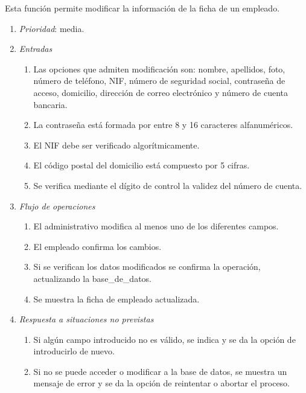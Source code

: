 
 \label{fun:editarempleado}
	Esta función permite modificar la información de la ficha de un empleado.

	\begin{enumerate}
		\item \textit{Prioridad}: media.
		\item \textit{Entradas}
		\begin{enumerate}
			\item Las opciones que admiten modificación son: nombre, apellidos, foto, número de teléfono, NIF, número de seguridad social, contraseña de acceso, domicilio, dirección de correo electrónico y número de cuenta bancaria.
			\item La contraseña está formada por entre 8 y 16 caracteres alfanuméricos.
			\item El \gls{NIF} debe ser verificado algorítmicamente.
			\item El código postal del domicilio está compuesto por 5 cifras.
			\item Se verifica mediante el dígito de control la validez del número de cuenta.
		\end{enumerate}
		\item \textit{Flujo de operaciones}
		\begin{enumerate}
			\item El administrativo modifica al menos uno de los diferentes campos.
			\item El empleado confirma los cambios.
			\item Si se verifican los datos modificados se confirma la operación, actualizando la \gls{base_de_datos}.
			\item Se muestra la ficha de empleado actualizada.
		\end{enumerate}
		\item \textit{Respuesta a situaciones no previstas}
		\begin{enumerate}
			\item Si algún campo introducido no es válido, se indica y se da la opción de introducirlo de nuevo.
			\item Si no se puede acceder o modificar a la base de datos, se muestra un mensaje de error y se da la opción de reintentar o abortar el proceso.
		\end{enumerate}
	\end{enumerate}
